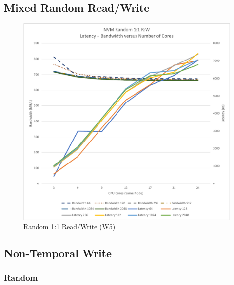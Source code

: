 \subsection{Mixed Random Read/Write }

\begin{figure}
    \centering
    \caption{Random 1:1 Read/Write (W5)}\label{chart:random:W5}
    \includegraphics[scale=0.5]{charts/random-w5-crop.pdf}
\end{figure}

\subsection{Non-Temporal Write}

\subsubsection{Random}

